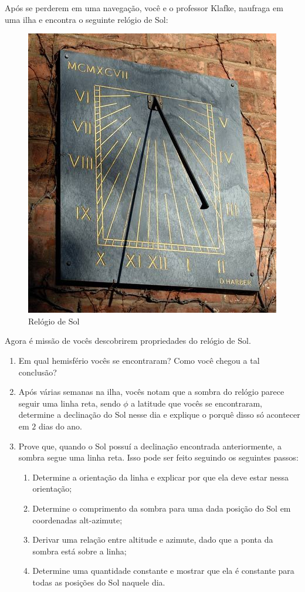 \documentclass[11pt]{article}
\begin{document}
    \begin{pproblem} Após se perderem em uma navegação, você e o professor Klafke, naufraga em uma ilha e encontra o seguinte relógio de Sol:
        \begin{figure}[H]
            \centering
            \includegraphics[width=0.5\linewidth]{imagens/q6.jpg}
            \caption{Relógio de Sol}
        \end{figure}
        Agora é missão de vocês descobrirem propriedades do relógio de Sol.
        \begin{enumerate}[label=\textbf{\alph*)}]
            \item Em qual hemisfério vocês se encontraram? Como você chegou a tal conclusão?
            \item Após várias semanas na ilha, vocês notam que a sombra do relógio parece seguir uma linha reta, sendo \(\phi\) a latitude que vocês se encontraram, determine a declinação do Sol nesse dia e explique o porquê disso só acontecer em \(2\) dias do ano.
            \item Prove que, quando o Sol possuí a declinação encontrada anteriormente, a sombra segue uma linha reta. Isso pode ser feito seguindo os seguintes passos:
            \begin{enumerate}[label=\roman*)]
                \item Determine a orientação da linha e explicar por que ela deve estar nessa orientação;
                \item Determine o comprimento da sombra para uma dada posição do Sol em coordenadas alt-azimute;
                \item Derivar uma relação entre altitude e azimute, dado que a ponta da sombra está sobre a linha;
                \item Determine uma quantidade constante e mostrar que ela é constante para todas as posições do Sol naquele dia.
            \end{enumerate}
        \end{enumerate}
    

\end{pproblem}
\end{document}
